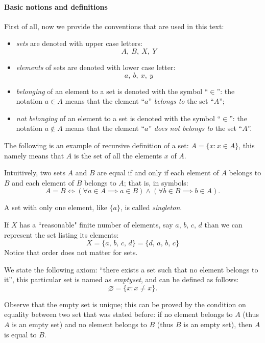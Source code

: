 \paragraph{Basic notions and definitions} First of all, now we provide the conventions that are used in this text:
\begin{itemize}
	\item \emph{sets} are denoted with upper case letters:
	$$ A, \ B, \ X, \ Y $$
	\item \emph{elements} of sets are denoted with lower case letter:
	$$a, \ b, \ x, \ y $$
	\item \emph{belonging} of an element to a set is denoted with the symbol ``$\in$'': the notation $a \in A$ means that the element ``$a$'' \textit{belongs to} the set ``$A$'';
	
	\item \emph{not belonging} of an element to a set is denoted with the symbol ``$\in$'': the notation $a \notin A$ means that the element ``$a$'' \textit{does not belongs to} the set ``$A$''.
\end{itemize}

The following is an example of recursive definition of a set: $A = \{ x: x \in A \}$, this namely means that $A$ is the set of all the elements $x$ of $A$.

Intuitively, two sets $A$ and $B$ are equal if and only if each element of $A$ belongs to $B$ and each element of $B$ belongs to $A$; that is, in symbols:
$$ 
A
=B 
\iff \left(\forall a \in A \implies a \in B\right) 
\wedge \left(\forall b \in B \implies b \in A\right)
.$$

A set with only one element, like $\{a\}$, is called \emph{singleton}.

If $X$ has a ``reasonable" finite number of elements, say $a,\,b,\,c,\,d$ than we can represent the set listing its elements:
$$ X=\{a,\,b,\,c,\,d\} =\{d,\,a,\,b,\,c\}$$
Notice that order does not matter for sets.

We state the following axiom: ``there exists a set such that no element belongs to it'', this particular set is named as \emph{emptyset}, and can be defined as follows: 
$$
\varnothing 
= \{x: x \neq x\}
.
$$

Observe that the empty set is unique; this can be proved by the condition on equality between two set that was stated before: if no element belongs to $A$ (thus $A$ is an empty set) and no element belongs to $B$ (thus $B$ is an empty set), then $A$ is equal to $B$.

